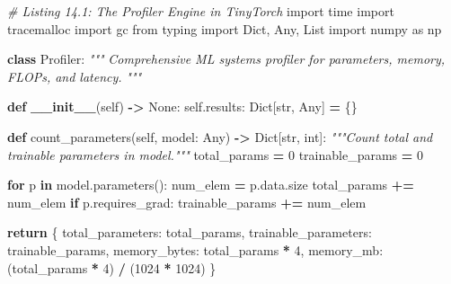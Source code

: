 \documentclass[
  letterpaper,
]{scrbook}
\newenvironment{Shaded}{\begin{snugshade}}{\end{snugshade}}
\newcommand{\BuiltInTok}[1]{#1}
\newcommand{\CommentTok}[1]{\textcolor[rgb]{0.56,0.35,0.01}{\textit{#1}}}
\newcommand{\ControlFlowTok}[1]{\textcolor[rgb]{0.13,0.29,0.53}{\textbf{#1}}}
\newcommand{\DecValTok}[1]{\textcolor[rgb]{0.00,0.00,0.81}{#1}}
\newcommand{\FunctionTok}[1]{\textcolor[rgb]{0.13,0.29,0.53}{\textbf{#1}}}
\newcommand{\ImportTok}[1]{#1}
\newcommand{\KeywordTok}[1]{\textcolor[rgb]{0.13,0.29,0.53}{\textbf{#1}}}
\newcommand{\NormalTok}[1]{#1}
\newcommand{\OperatorTok}[1]{\textcolor[rgb]{0.81,0.36,0.00}{\textbf{#1}}}
\newcommand{\StringTok}[1]{\textcolor[rgb]{0.31,0.60,0.02}{#1}}
\newcommand{\VariableTok}[1]{\textcolor[rgb]{0.00,0.00,0.00}{#1}}
\begin{document}
\begin{Shaded}
\begin{Highlighting}[]
\CommentTok{\# Listing 14.1: The Profiler Engine in TinyTorch}
\ImportTok{import}\NormalTok{ time}
\ImportTok{import}\NormalTok{ tracemalloc}
\ImportTok{import}\NormalTok{ gc}
\ImportTok{from}\NormalTok{ typing }\ImportTok{import}\NormalTok{ Dict, Any, List}
\ImportTok{import}\NormalTok{ numpy }\ImportTok{as}\NormalTok{ np}

\KeywordTok{class}\NormalTok{ Profiler:}
    \CommentTok{"""}
\CommentTok{    Comprehensive ML systems profiler for parameters, memory, FLOPs, and latency.}
\CommentTok{    """}

    \KeywordTok{def} \FunctionTok{\_\_init\_\_}\NormalTok{(}\VariableTok{self}\NormalTok{) }\OperatorTok{{-}\textgreater{}} \VariableTok{None}\NormalTok{:}
        \VariableTok{self}\NormalTok{.results: Dict[}\BuiltInTok{str}\NormalTok{, Any] }\OperatorTok{=}\NormalTok{ \{\}}

    \KeywordTok{def}\NormalTok{ count\_parameters(}\VariableTok{self}\NormalTok{, model: Any) }\OperatorTok{{-}\textgreater{}}\NormalTok{ Dict[}\BuiltInTok{str}\NormalTok{, }\BuiltInTok{int}\NormalTok{]:}
        \CommentTok{"""Count total and trainable parameters in model."""}
\NormalTok{        total\_params }\OperatorTok{=} \DecValTok{0}
\NormalTok{        trainable\_params }\OperatorTok{=} \DecValTok{0}

        \ControlFlowTok{for}\NormalTok{ p }\KeywordTok{in}\NormalTok{ model.parameters():}
\NormalTok{            num\_elem }\OperatorTok{=}\NormalTok{ p.data.size}
\NormalTok{            total\_params }\OperatorTok{+=}\NormalTok{ num\_elem}
            \ControlFlowTok{if}\NormalTok{ p.requires\_grad:}
\NormalTok{                trainable\_params }\OperatorTok{+=}\NormalTok{ num\_elem}

        \ControlFlowTok{return}\NormalTok{ \{}
            \StringTok{\textquotesingle{}total\_parameters\textquotesingle{}}\NormalTok{: total\_params,}
            \StringTok{\textquotesingle{}trainable\_parameters\textquotesingle{}}\NormalTok{: trainable\_params,}
            \StringTok{\textquotesingle{}memory\_bytes\textquotesingle{}}\NormalTok{: total\_params }\OperatorTok{*} \DecValTok{4}\NormalTok{,}
            \StringTok{\textquotesingle{}memory\_mb\textquotesingle{}}\NormalTok{: (total\_params }\OperatorTok{*} \DecValTok{4}\NormalTok{) }\OperatorTok{/}\NormalTok{ (}\DecValTok{1024} \OperatorTok{*} \DecValTok{1024}\NormalTok{)}
\NormalTok{        \}}


\end{Highlighting}
\end{Shaded}
\end{document}
